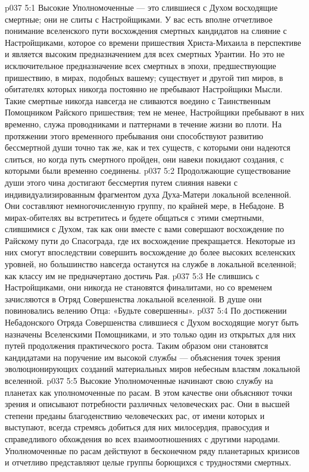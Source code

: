 \vs p037 5:1 Высокие Уполномоченные --- это слившиеся с Духом восходящие смертные; они не слиты с Настройщиками. У вас есть вполне отчетливое понимание вселенского пути восхождения смертных кандидатов на слияние с Настройщиками, которое со времени пришествия Христа\hyp{}Михаила в перспективе и является высоким предназначением для всех смертных Урантии. Но это не исключительное предназначение всех смертных в эпохи, предшествующие пришествию, в мирах, подобных вашему; существует и другой тип миров, в обитателях которых никогда постоянно не пребывают Настройщики Мысли. Такие смертные никогда навсегда не сливаются воедино с Таинственным Помощником Райского пришествия; тем не менее, Настройщики пребывают в них временно, служа проводниками и паттернами в течение жизни во плоти. На протяжении этого временного пребывания они способствуют развитию бессмертной души точно так же, как и тех существ, с которыми они надеются слиться, но когда путь смертного пройден, они навеки покидают создания, с которыми были временно соединены.
\vs p037 5:2 Продолжающие существование души этого чина достигают бессмертия путем слияния навеки с индивидуализированным фрагментом духа Духа\hyp{}Матери локальной вселенной. Они составляют немногочисленную группу, по крайней мере, в Небадоне. В мирах\hyp{}обителях вы встретитесь и будете общаться с этими смертными, слившимися с Духом, так как они вместе с вами совершают восхождение по Райскому пути до Спасограда, где их восхождение прекращается. Некоторые из них смогут впоследствии совершить восхождение до более высоких вселенских уровней, но большинство навсегда останутся на службе в локальной вселенной; как классу им не предначертано достичь Рая.
\vs p037 5:3 Не слившись с Настройщиками, они никогда не становятся финалитами, но со временем зачисляются в Отряд Совершенства локальной вселенной. В душе они повиновались велению Отца: «Будьте совершенны».
\vs p037 5:4 \pc По достижении Небадонского Отряда Совершенства слившиеся с Духом восходящие могут быть назначены Вселенскими Помощниками, и это только один из открытых для них путей продолжения практического роста. Таким образом они становятся кандидатами на поручение им высокой службы --- объяснения точек зрения эволюционирующих созданий материальных миров небесным властям локальной вселенной.
\vs p037 5:5 Высокие Уполномоченные начинают свою службу на планетах как уполномоченные по расам. В этом качестве они объясняют точки зрения и описывают потребности различных человеческих рас. Они в высшей степени преданы благоденствию человеческих рас, от имени которых и выступают, всегда стремясь добиться для них милосердия, правосудия и справедливого обхождения во всех взаимоотношениях с другими народами. Уполномоченные по расам действуют в бесконечном ряду планетарных кризисов и отчетливо представляют целые группы борющихся с трудностями смертных.
